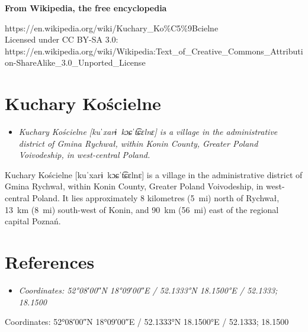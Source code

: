 \textbf{From Wikipedia, the free encyclopedia}

https://en.wikipedia.org/wiki/Kuchary\_Ko\%C5\%9Bcielne\\
Licensed under CC BY-SA 3.0:\\
https://en.wikipedia.org/wiki/Wikipedia:Text\_of\_Creative\_Commons\_Attribution-ShareAlike\_3.0\_Unported\_License

\section{Kuchary Kościelne}\label{kuchary-koux15bcielne}

\begin{itemize}
\item
  \emph{Kuchary Kościelne {[}kuˈxarɨ~kɔɕˈt͡ɕɛlnɛ{]} is a village in the
  administrative district of Gmina Rychwał, within Konin County, Greater
  Poland Voivodeship, in west-central Poland.}
\end{itemize}

Kuchary Kościelne {[}kuˈxarɨ~kɔɕˈt͡ɕɛlnɛ{]} is a village in the
administrative district of Gmina Rychwał, within Konin County, Greater
Poland Voivodeship, in west-central Poland. It lies approximately 8
kilometres (5~mi) north of Rychwał, 13~km (8~mi) south-west of Konin,
and 90~km (56~mi) east of the regional capital Poznań.

\section{References}\label{references}

\begin{itemize}
\item
  \emph{Coordinates: 52°08′00″N 18°09′00″E﻿ / ﻿52.1333°N 18.1500°E﻿ /
  52.1333; 18.1500}
\end{itemize}

Coordinates: 52°08′00″N 18°09′00″E﻿ / ﻿52.1333°N 18.1500°E﻿ / 52.1333;
18.1500
